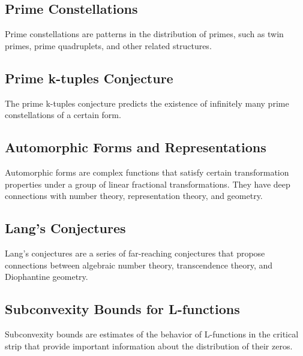 \documentclass{article}
\begin{document}
\subsection{Prime Constellations}

\begin{definition}
Prime constellations are patterns in the distribution of primes, such as twin primes, prime quadruplets, and other related structures.
\end{definition}

\subsection{Prime k-tuples Conjecture}

\begin{theorem}
The prime k-tuples conjecture predicts the existence of infinitely many prime constellations of a certain form.
\end{theorem}

\subsection{Automorphic Forms and Representations}

\begin{definition}
Automorphic forms are complex functions that satisfy certain transformation properties under a group of linear fractional transformations. They have deep connections with number theory, representation theory, and geometry.
\end{definition}

\subsection{Lang's Conjectures}

\begin{definition}
Lang's conjectures are a series of far-reaching conjectures that propose connections between algebraic number theory, transcendence theory, and Diophantine geometry.
\end{definition}

\subsection{Subconvexity Bounds for L-functions}

\begin{definition}
Subconvexity bounds are estimates of the behavior of L-functions in the critical strip that provide important information about the distribution of their zeros.
\end{definition}
\end{document}
